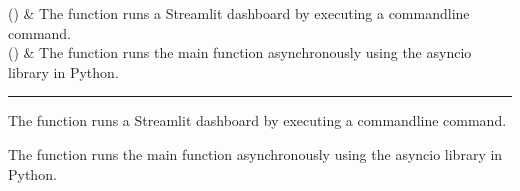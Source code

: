 \documentclass[letterpaper,10pt,english,openany,oneside]{sphinxmanual}
\begin{document}
{{{{\begin{savenotes}\sphinxattablestart
\sphinxthistablewithglobalstyle
\sphinxthistablewithnovlinesstyle
\centering
\begin{tabulary}{\linewidth}[t]{}
\sphinxtoprule
\sphinxtableatstartofbodyhook
\sphinxAtStartPar
{\hyperref[\detokenize{api_reference/generated/QuadratiK.ui.UI:QuadratiK.ui.UI.main}]{}}()
&
\sphinxAtStartPar
The  function runs a Streamlit dashboard by executing a command\sphinxhyphen{}line command.
\\
\sphinxhline
\sphinxAtStartPar
{\hyperref[\detokenize{api_reference/generated/QuadratiK.ui.UI:QuadratiK.ui.UI.run}]{}}()
&
\sphinxAtStartPar
The function runs the main function asynchronously using the asyncio library in Python.
\\
\sphinxbottomrule
\end{tabulary}
\sphinxtableafterendhook\par
\sphinxattableend\end{savenotes}


\bigskip\hrule\bigskip


\begin{fulllineitems}
\label{\detokenize{api_reference/generated/QuadratiK.ui.UI:QuadratiK.ui.UI.main}}
\pysigstartsignatures
{}
\pysigstopsignatures
\sphinxAtStartPar
The  function runs a Streamlit dashboard by executing a command\sphinxhyphen{}line command.

\end{fulllineitems}


\begin{fulllineitems}
\label{\detokenize{api_reference/generated/QuadratiK.ui.UI:QuadratiK.ui.UI.run}}
\pysigstartsignatures
{}
\pysigstopsignatures
\sphinxAtStartPar
The function runs the main function asynchronously using the asyncio library in Python.

\end{fulllineitems}



}}}}
\end{document}

